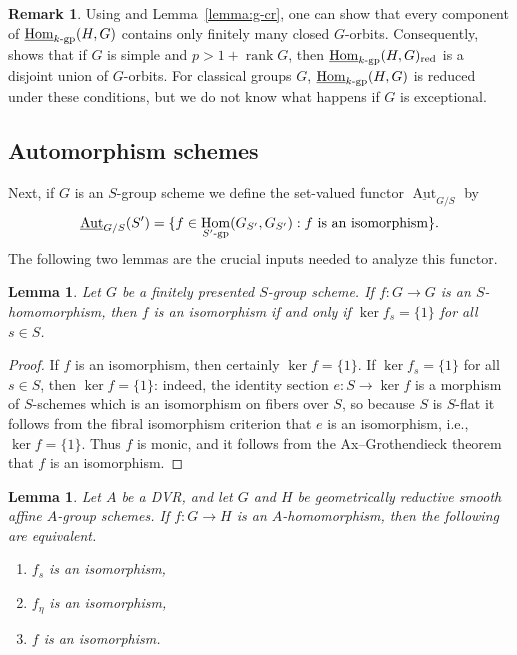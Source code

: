 \documentclass[11pt, letterpaper,english]{amsart}
\theoremstyle{plain}
\newtheorem{lemma}[lem]{Lemma}
\theoremstyle{definition}
\newtheorem{remark}[lem]{Remark}
\numberwithin{equation}{section}
\numberwithin{lem}{section}
\DeclareMathOperator{\Hom}{Hom}
\DeclareMathOperator{\Aut}{Aut}
\DeclareMathOperator{\rank}{rank}
\begin{document}
\begin{remark}
    Using \cite[Proposition 3.2, Theorem 10.3]{martin03} and Lemma~\ref{lemma:g-cr}, one can show that every component of $\underline{\Hom}_{k\textrm{-}\rm{gp}}(H, G)$ contains only finitely many closed $G$-orbits. Consequently, \cite[Th\'eor\`eme 4.4]{Serre-cr} shows that if $G$ is simple and $p > 1 + \rank G$, then $\underline{\Hom}_{k\textrm{-}\rm{gp}}(H, G)_{\mathrm{red}}$ is a disjoint union of $G$-orbits. For classical groups $G$, $\underline{\Hom}_{k\textrm{-}\rm{gp}}(H, G)$ is reduced under these conditions, but we do not know what happens if $G$ is exceptional.
\end{remark}




\subsection{Automorphism schemes}

Next, if $G$ is an $S$-group scheme we define the set-valued functor $\underline{\Aut}_{G/S}$ by
\[
\underline{\Aut}_{G/S}(S') = \{f \in \Hom_{S'\textrm{-}\rm{gp}}(G_{S'}, G_{S'}): f\text{ is an isomorphism}\}.
\]
The following two lemmas are the crucial inputs needed to analyze this functor.

\begin{lemma}\label{lemma:iso-kernel}
Let $G$ be a finitely presented $S$-group scheme. If $f: G \to G$ is an $S$-homomorphism, then $f$ is an isomorphism if and only if $\ker f_s = \{1\}$ for all $s \in S$.
\end{lemma}

\begin{proof}
If $f$ is an isomorphism, then certainly $\ker f = \{1\}$. If $\ker f_s = \{1\}$ for all $s \in S$, then $\ker f = \{1\}$: indeed, the identity section $e: S \to \ker f$ is a morphism of $S$-schemes which is an isomorphism on fibers over $S$, so because $S$ is $S$-flat it follows from the fibral isomorphism criterion \cite[IV\textsubscript{4}, Corollaire 17.9.5]{EGA} that $e$ is an isomorphism, i.e., $\ker f = \{1\}$. Thus $f$ is monic, and it follows from the Ax--Grothendieck theorem \cite[IV\textsubscript{4}, Proposition 17.9.6]{EGA} that $f$ is an isomorphism.
\end{proof}

\begin{lemma}\label{lemma:dvr-morphism}
Let $A$ be a DVR, and let $G$ and $H$ be geometrically reductive smooth affine $A$-group schemes. If $f: G \to H$ is an $A$-homomorphism, then the following are equivalent.
\begin{enumerate}
    \item $f_s$ is an isomorphism,
    \item $f_\eta$ is an isomorphism,
    \item $f$ is an isomorphism.
\end{enumerate}
\end{lemma}
\end{document}
